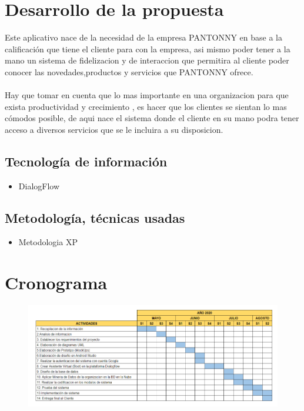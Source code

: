 \documentclass[preprint,12pt]{elsarticle}
\begin{document}
\section{Desarrollo de la propuesta}
Este aplicativo nace de la necesidad de la empresa PANTONNY en base a la calificación que tiene el cliente para con la empresa, asi mismo poder tener a la mano un sistema de fidelizacion y de interaccion que permitira al cliente poder conocer las novedades,productos y servicios que PANTONNY ofrece.
\\  \\
Hay que tomar en cuenta que lo mas importante en una organizacion para que exista productividad  y crecimiento , es hacer que los clientes se sientan lo mas cómodos posible, de aqui nace el sistema donde el cliente en su mano podra tener acceso a diversos servicios que se le incluira a su disposicion.


\subsection{\textbf{Tecnología de información}}
\begin{itemize}
	\item DialogFlow
\end{itemize}
\subsection{\textbf{Metodología, técnicas usadas}}
\begin{itemize}
	\item Metodologia XP
\end{itemize}



\section{Cronograma}
\begin{figure}[htb]
	\begin{center}
		\includegraphics[width=12cm]{./IMAGENES/cronograma} 
	\end{center}
\end{figure}



	
	\newpage
	


	
\end{document}
